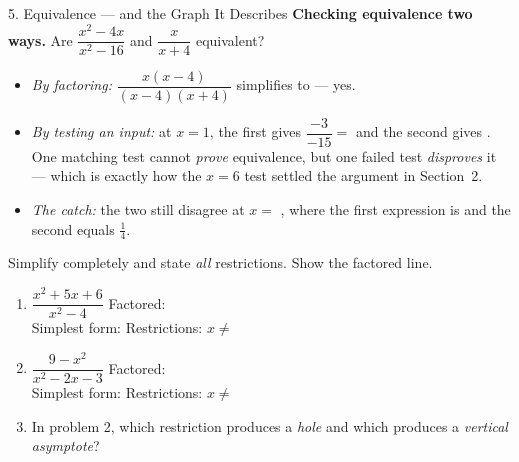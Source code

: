 \documentclass[10pt]{article}
\begin{document}
\begin{notesbox}{5. Equivalence --- and the Graph It Describes}
\vspace{3pt}
\textbf{Checking equivalence two ways.} Are $\dfrac{x^2-4x}{x^2-16}$ and $\dfrac{x}{x+4}$ equivalent?
\begin{itemize}[leftmargin=1.5em, itemsep=3pt]
  \item \emph{By factoring:} $\dfrac{x(x-4)}{(x-4)(x+4)}$ simplifies to  --- yes.
  \item \emph{By testing an input:} at $x=1$, the first gives $\dfrac{-3}{-15}=$  and the
        second gives . One matching test cannot \emph{prove} equivalence, but one failed
        test \emph{disproves} it --- which is exactly how the $x=6$ test settled the argument in
        Section~2.
  \item \emph{The catch:} the two still disagree at $x=$ , where the first expression is
         and the second equals $\tfrac14$.
\end{itemize}
\end{notesbox}

\begin{practicebox}
Simplify completely and state \emph{all} restrictions. Show the factored line.

\vspace{3pt}
\begin{enumerate}[leftmargin=1.7em, itemsep=8pt]
  \item $\dfrac{x^2+5x+6}{x^2-4}$ \hfill Factored:  \\[4pt]
        Simplest form:  \quad Restrictions: $x\neq$ 
  \item $\dfrac{9-x^2}{x^2-2x-3}$ \hfill Factored:  \\[4pt]
        Simplest form:  \quad Restrictions: $x\neq$ 
  \item In problem 2, which restriction produces a \emph{hole} and which produces a \emph{vertical
        asymptote}? 
\end{enumerate}
\end{practicebox}
\end{document}
